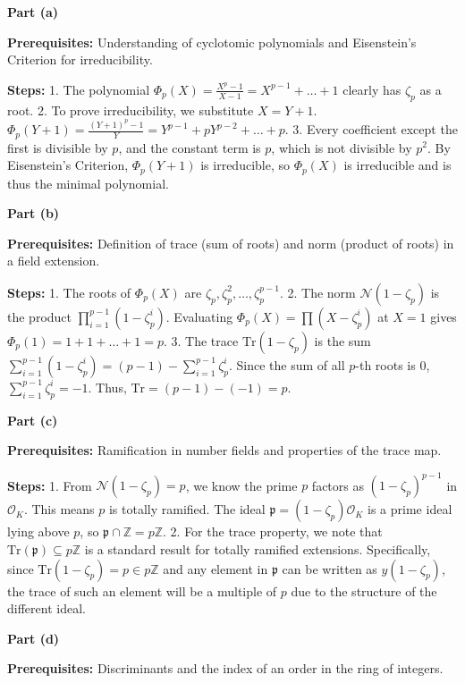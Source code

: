 \begin{solution}
\textbf{Part (a)}

\medskip
\textbf{Prerequisites:}
Understanding of cyclotomic polynomials and Eisenstein's Criterion for irreducibility.

\medskip
\textbf{Steps:}
1. The polynomial $\Phi_p(X) = \frac{X^p-1}{X-1} = X^{p-1} + \dots + 1$ clearly has $\zeta_p$ as a root.
2. To prove irreducibility, we substitute $X = Y+1$. $\Phi_p(Y+1) = \frac{(Y+1)^p - 1}{Y} = Y^{p-1} + p Y^{p-2} + \dots + p$.
3. Every coefficient except the first is divisible by $p$, and the constant term is $p$, which is not divisible by $p^2$. By Eisenstein's Criterion, $\Phi_p(Y+1)$ is irreducible, so $\Phi_p(X)$ is irreducible and is thus the minimal polynomial.

\bigskip
\textbf{Part (b)}

\medskip
\textbf{Prerequisites:}
Definition of trace (sum of roots) and norm (product of roots) in a field extension.

\medskip
\textbf{Steps:}
1. The roots of $\Phi_p(X)$ are $\zeta_p, \zeta_p^2, \dots, \zeta_p^{p-1}$.
2. The norm $\mathcal{N}(1-\zeta_p)$ is the product $\prod_{i=1}^{p-1} (1-\zeta_p^i)$. Evaluating $\Phi_p(X) = \prod (X-\zeta_p^i)$ at $X=1$ gives $\Phi_p(1) = 1 + 1 + \dots + 1 = p$.
3. The trace $\text{Tr}(1-\zeta_p)$ is the sum $\sum_{i=1}^{p-1} (1-\zeta_p^i) = (p-1) - \sum_{i=1}^{p-1} \zeta_p^i$. Since the sum of all $p$-th roots is 0, $\sum_{i=1}^{p-1} \zeta_p^i = -1$. Thus, $\text{Tr} = (p-1) - (-1) = p$.

\bigskip
\textbf{Part (c)}

\medskip
\textbf{Prerequisites:}
Ramification in number fields and properties of the trace map.

\medskip
\textbf{Steps:}
1. From $\mathcal{N}(1-\zeta_p) = p$, we know the prime $p$ factors as $(1-\zeta_p)^{p-1}$ in $\mathcal{O}_K$. This means $p$ is totally ramified. The ideal $\mathfrak{p} = (1-\zeta_p)\mathcal{O}_K$ is a prime ideal lying above $p$, so $\mathfrak{p} \cap \mathbb{Z} = p\mathbb{Z}$.
2. For the trace property, we note that $\text{Tr}(\mathfrak{p}) \subseteq p\mathbb{Z}$ is a standard result for totally ramified extensions. Specifically, since $\text{Tr}(1-\zeta_p) = p \in p\mathbb{Z}$ and any element in $\mathfrak{p}$ can be written as $y(1-\zeta_p)$, the trace of such an element will be a multiple of $p$ due to the structure of the different ideal.

\bigskip
\textbf{Part (d)}

\medskip
\textbf{Prerequisites:}
Discriminants and the index of an order in the ring of integers.


\end{solution}
